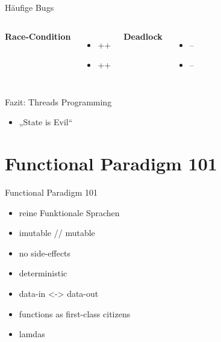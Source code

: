 \documentclass[compress]{beamer}
\begin{document}
  \begin{frame}{Häufige Bugs}
    \begin{columns}[c]
      \textbf{Race-Condition}
      \begin{itemize}
        \item ++
        \item ++
      \end{itemize}
      \textbf{Deadlock}
      \begin{itemize}
        \item --
        \item --
      \end{itemize}
    \end{columns}
  \end{frame}
  
  \begin{frame}{Fazit: Threads Programming}
    \begin{itemize}
      \item „State is Evil“
    \end{itemize}
  \end{frame}
  

\section{Functional Paradigm 101}
  \begin{frame}{Functional Paradigm 101}
    \begin{itemize}
      \item reine Funktionale Sprachen
      \item imutable // mutable
      \item no side-effects
      \item deterministic
      \item data-in <-> data-out
      \item functions as first-class citizens
      \item lamdas
    \end{itemize}
  \end{frame}
\end{document}
